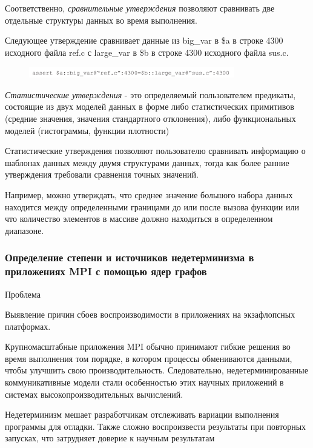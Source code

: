 Соответственно, \textit{сравнительные утверждения} позволяют сравнивать две отдельные структуры данных во время выполнения.

Следующее утверждение сравнивает данные из big_var в \$a в строке 4300 исходного файла ref.c с large_var в \$b в строке 4300 исходного файла sus.c.

\begin{figure}[h]
	\includegraphics[width=0.8\textwidth]{ResearchNotes/rndhpc_not_edt_2021_11_10/krekhtunova/assert2.png}
\end{figure}

\textit{Статистические утверждения} - это определяемый пользователем предикаты, состоящие из двух моделей данных в форме либо статистических примитивов (средние значения, значения стандартного отклонения), либо функциональных моделей (гистограммы, функции плотности)

Статистические утверждения позволяют пользователю сравнивать информацию о шаблонах данных между двумя структурами данных, тогда как более ранние утверждения требовали сравнения точных значений.

Например, можно утверждать, что среднее значение большого набора данных находится между определенными границами до или после вызова функции или что количество элементов в массиве должно находиться в определенном диапазоне.

\subsubsection{Определение степени и источников недетерминизма в приложениях MPI с помощью ядер графов \cite{Chapp2021}}

Проблема

Выявление причин сбоев воспроизводимости в приложениях на экзафлопсных платформах.

Крупномасштабные приложения MPI обычно принимают гибкие решения во время выполнения том порядке, в котором процессы обмениваются данными, чтобы улучшить свою производительность. Следовательно, недетерминированные коммуникативные модели стали особенностью этих научных приложений в системах высокопроизводительных вычислений.

Недетерминизм мешает разработчикам отслеживать вариации выполнения программы для отладки. Также сложно воспроизвести результаты при повторных запусках, что затрудняет доверие к научным результатам
\newline

